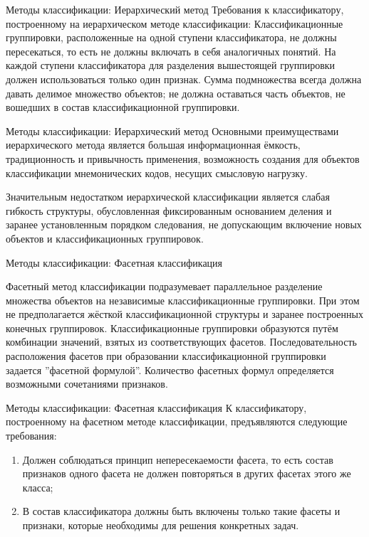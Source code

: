 \documentclass{beamer}
\begin{document}
\begin{frame}{Методы классификации: Иерархический метод} 
Требования к классификатору, построенному на иерархическом методе классификации: Классификационные группировки, расположенные на одной ступени классификатора, не должны 
пересекаться, то есть не должны включать в себя аналогичных понятий. На каждой ступени классификатора для разделения вышестоящей группировки должен использоваться только 
один признак. Сумма подмножества всегда должна давать делимое множество объектов; не должна оставаться часть объектов, не вошедших в состав классификационной группировки.
\end{frame}

\begin{frame}{Методы классификации: Иерархический метод} 
Основными преимуществами иерархического метода является большая информационная ёмкость, 
традиционность и привычность применения, возможность создания для объектов классификации
мнемонических кодов, несущих смысловую нагрузку.

Значительным недостатком иерархической классификации является слабая гибкость структуры, 
обусловленная фиксированным основанием деления и заранее установленным порядком следования, не допускающим включение новых объектов и классификационных группировок.  


\end{frame}






\begin{frame}{Методы классификации: Фасетная классификация}

Фасетный метод классификации подразумевает параллельное разделение множества объектов на независимые 
классификационные группировки. При этом не предполагается жёсткой классификационной структуры и заранее построенных конечных группировок. 
Классификационные группировки образуются путём комбинации значений, взятых из соответствующих фасетов.
 Последовательность расположения фасетов при образовании классификационной группировки задается ''фасетной формулой''.
  Количество фасетных формул определяется возможными сочетаниями признаков.
\end{frame}

\begin{frame}{Методы классификации: Фасетная классификация} 
К классификатору, построенному на фасетном методе классификации, предъявляются следующие требования:
\begin{enumerate}
  \item Должен соблюдаться принцип непересекаемости фасета, то есть состав признаков одного фасета не должен повторяться в других фасетах этого же класса;
  \item В состав классификатора должны быть включены только такие фасеты и признаки, которые необходимы для решения конкретных задач.
\end{enumerate}

\end{frame}
\end{document}
